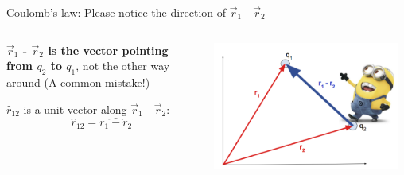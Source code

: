 %
%
%

\begin{frame}{Coulomb's law: Please notice the direction of $\vec{r}_1$ - $\vec{r}_2$}

  \begin{columns}
    \begin{column}{0.35\textwidth}
      \begin{center}
       {\color{red} \bf
        $\vec{r}_1$ - $\vec{r}_2$ is the vector pointing from $q_2$ to $q_1$},
       not the other way around (A common mistake!)\\
      \end{center}
      \begin{center}
        $\hat{r}_{12}$ is a unit vector along $\vec{r}_1$ - $\vec{r}_2$:
        \begin{equation*}
         \hat{r}_{12} = \widehat{r_1-r_2}
        \end{equation*}
      \end{center}
    \end{column}
    \begin{column}{0.65\textwidth}
      \begin{center}
        \includegraphics[width=0.95\textwidth]{./images/schematics/r1_r2_direction.png}\\
      \end{center}
    \end{column}
  \end{columns}

  \vspace{0.2cm}


\end{frame}
